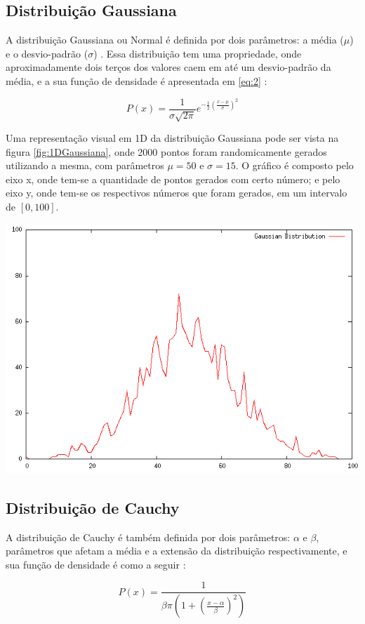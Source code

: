 \subsection{Distribuição Gaussiana}
A distribuição Gaussiana ou Normal é definida por dois parâmetros: a média ($\mu$) e o desvio-padrão ($\sigma$) \cite{fister}. Essa distribuição tem uma propriedade, onde aproximadamente dois terços dos valores caem em até um desvio-padrão da média, e a sua função de densidade é apresentada em \ref{eq:2} \cite{fister}:

\begin{equation}
\label{eq:2}
P(x) = \frac{1}{\sigma \sqrt{2\pi}}e^{-\frac{1}{2}(\frac{x - \mu}{\sigma})^2}
\end{equation}

Uma representação visual em 1D da distribuição Gaussiana pode ser vista na figura \ref{fig:1DGaussiana}, onde 2000 pontos foram randomicamente gerados utilizando a mesma, com parâmetros $\mu = 50$ e $\sigma = 15$. O gráfico é composto pelo eixo x, onde tem-se a quantidade de pontos gerados com certo número; e pelo eixo y, onde tem-se os respectivos números que foram gerados, em um intervalo de $[0, 100]$.

{
    \centering
    \includegraphics[width=0.5\linewidth]{figuras/DistribuicaoGaussiana.png}
    \label{fig:1DGaussiana}
}

\subsection{Distribuição de Cauchy}
A distribuição de Cauchy é também definida por dois parâmetros: $\alpha$ e $\beta$, parâmetros que afetam a média e a extensão da distribuição respectivamente, e sua função de densidade é como a seguir \cite{thomsen}:

\begin{equation}
P(x) = \frac{1}{\beta \pi (1 + (\frac{x - \alpha}{\beta})^2)}
\end{equation}

